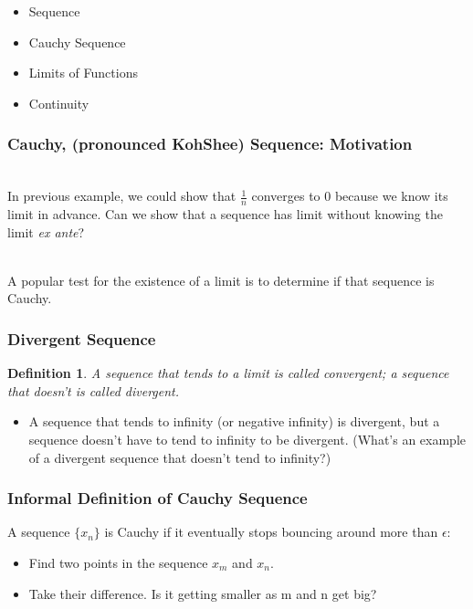 \documentclass[handout]{beamer}
\newtheorem{defn}{Definition}
\numberwithin{equation}{section}
\begin{document}
\begin{frame}

\begin{itemize}
\item \textcolor{mygray}{Sequence}
 
\item \textcolor{myblack}{Cauchy Sequence}
\item \textcolor{mygray}{Limits of Functions}
\item \textcolor{mygray}{Continuity}
\end{itemize}

\end{frame}

\begin{frame}
\frametitle{Cauchy, (pronounced KohShee) Sequence: Motivation}


\ \\In previous example, we could show that $\frac{1}{n}$ converges to 0 because we know its limit in advance. Can we show that a sequence has limit without knowing the limit \emph{ex ante}?\pause

\ \\A popular test for the existence of a limit is to determine if that sequence is Cauchy.



\end{frame}




\begin{frame}
\frametitle{Divergent Sequence}

\begin{defn}
A sequence that tends to a limit is called convergent; a sequence that doesn't is called divergent.
\end{defn} \pause

\begin{itemize}
\item A sequence that tends to infinity (or negative infinity) is divergent, but a sequence doesn't have to tend to infinity to be divergent. \pause (What's an example of a divergent sequence that doesn't tend to infinity?)
\end{itemize}

\end{frame}


\begin{frame}
\frametitle{Informal Definition of Cauchy Sequence}

A sequence  $\{x_{n} \}$ is Cauchy if it eventually stops bouncing around more than $\epsilon$:

\begin{itemize}
\item Find two points in the sequence $x_m$ and $x_n$.
\item Take their difference.  Is it getting smaller as m and n get big?
\end{itemize}


\end{frame}
\end{document}
